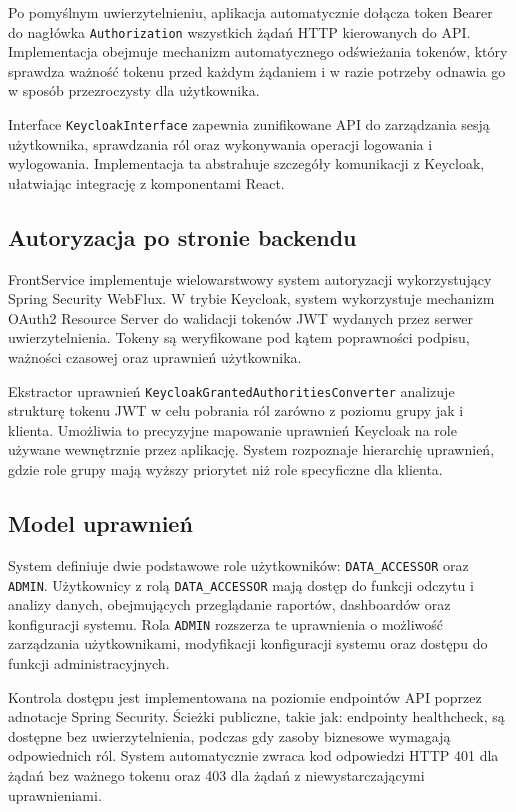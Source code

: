 Po pomyślnym uwierzytelnieniu, aplikacja automatycznie dołącza token Bearer do nagłówka \texttt{Authorization} wszystkich żądań HTTP kierowanych do API. Implementacja obejmuje mechanizm automatycznego odświeżania tokenów, który sprawdza ważność tokenu przed każdym żądaniem i w razie potrzeby odnawia go w sposób przezroczysty dla użytkownika.

Interface \texttt{KeycloakInterface} zapewnia zunifikowane API do zarządzania sesją użytkownika, sprawdzania ról oraz wykonywania operacji logowania i wylogowania. Implementacja ta abstrahuje szczegóły komunikacji z Keycloak, ułatwiając integrację z komponentami React.

\subsection{Autoryzacja po stronie backendu}

FrontService implementuje wielowarstwowy system autoryzacji wykorzystujący Spring Security WebFlux. W trybie Keycloak, system wykorzystuje mechanizm OAuth2 Resource Server do walidacji tokenów JWT wydanych przez serwer uwierzytelnienia. Tokeny są weryfikowane pod kątem poprawności podpisu, ważności czasowej oraz uprawnień użytkownika.

Ekstractor uprawnień \texttt{KeycloakGrantedAuthoritiesConverter} analizuje strukturę tokenu JWT w celu pobrania ról zarówno z poziomu grupy jak i klienta. Umożliwia to precyzyjne mapowanie uprawnień Keycloak na role używane wewnętrznie przez aplikację. System rozpoznaje hierarchię uprawnień, gdzie role grupy mają wyższy priorytet niż role specyficzne dla klienta.

\subsection{Model uprawnień}

System definiuje dwie podstawowe role użytkowników: \texttt{DATA\_ACCESSOR} oraz \texttt{ADMIN}. Użytkownicy z rolą \texttt{DATA\_ACCESSOR} mają dostęp do funkcji odczytu i analizy danych, obejmujących przeglądanie raportów, dashboardów oraz konfiguracji systemu. Rola \texttt{ADMIN} rozszerza te uprawnienia o możliwość zarządzania użytkownikami, modyfikacji konfiguracji systemu oraz dostępu do funkcji administracyjnych.

Kontrola dostępu jest implementowana na poziomie endpointów API poprzez adnotacje Spring Security. Ścieżki publiczne, takie jak: endpointy healthcheck, są dostępne bez uwierzytelnienia, podczas gdy zasoby biznesowe wymagają odpowiednich ról. System automatycznie zwraca kod odpowiedzi HTTP 401 dla żądań bez ważnego tokenu oraz 403 dla żądań z niewystarczającymi uprawnieniami.

